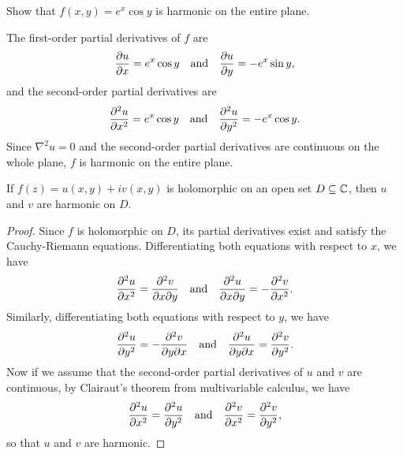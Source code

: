 \begin{example}
    Show that \(f(x, y) = e^x \cos y\) is harmonic on the entire plane.

    \begin{solution}
        The first-order partial derivatives of \(f\) are
        \[
            \frac{\partial u}{\partial x} = e^x \cos y \quad \text{and} \quad \frac{\partial u}{\partial y} = -e^x \sin y,
        \]
        and the second-order partial derivatives are
        \[
            \frac{\partial ^2u}{\partial x^2} = e^x \cos y \quad \text{and} \quad \frac{\partial ^2u}{\partial y^2} = -e^x \cos y.
        \]
        Since \(\nabla^2 u = 0\) and the second-order partial derivatives are continuous on the whole plane, \(f\) is harmonic on the entire plane.
    \end{solution}
\end{example}



\begin{theorem}
    If \(f(z) = u(x, y) + iv(x, y)\) is holomorphic on an open set \(D \subseteq \mathbb{C}\), then \(u\) and \(v\) are harmonic on \(D\).
    \label{thm:holomorphic-implies-harmonic-continuous}
\end{theorem}

\begin{proof}
    Since \(f\) is holomorphic on \(D\), its partial derivatives exist and satisfy the Cauchy-Riemann equations. Differentiating both equations with respect to \(x\), we have
    \[
        \frac{\partial ^2u}{\partial x^2} = \frac{\partial^2 v}{\partial x \partial y} \quad \text{and} \quad \frac{\partial^2 u}{\partial x \partial y} = -\frac{\partial ^2v}{\partial x^2}.
    \]
    Similarly, differentiating both equations with respect to \(y\), we have
    \[
        \frac{\partial ^2u}{\partial y^2} = -\frac{\partial^2 v}{\partial y \partial x} \quad \text{and} \quad \frac{\partial^2 u}{\partial y \partial x} = \frac{\partial ^2v}{\partial y^2}.
    \]
    Now if we assume that the second-order partial derivatives of \(u\) and \(v\) are continuous, by Clairaut's theorem from multivariable calculus, we have
    \[
        \frac{\partial ^2 u}{\partial  x^2} = \frac{\partial ^2 u}{\partial  y^2} \quad \text{and} \quad \frac{\partial ^2 v}{\partial  x^2} = \frac{\partial ^2 v}{\partial  y^2},
    \]
    so that \(u\) and \(v\) are harmonic.
\end{proof}

